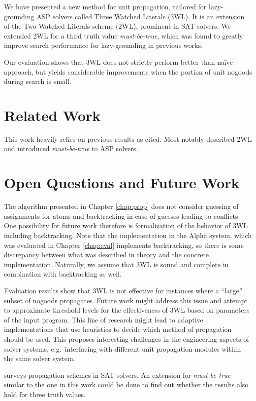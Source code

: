 \documentclass{vutinfth} %
\newcommand{\mbt}{must-be-true\xspace}
\begin{document}
We have presented a new method for unit propagation, tailored for lazy-grounding ASP solvers called Three Watched Literals (3WL). It is an extension of the Two Watched Literals scheme (2WL), prominent in SAT solvers. We extended 2WL for a third truth value \emph{\mbt}, which was found to greatly improve search performance for lazy-grounding in previous works.

Our evaluation shows that 3WL does not strictly perform better than na\"{i}ve approach, but yields considerable improvements when the portion of unit nogoods during search is small.

\section{Related Work}

This work heavily relies on previous results as cited. Most notably \citet{effsat,questsat} described 2WL and \citet{dlv-mbt} introduced \emph{\mbt} to ASP solvers.

\section{Open Questions and Future Work}

The algorithm presented in Chapter \ref{chap:prop} does not consider guessing of assignments for atoms and backtracking in case of guesses leading to conflicts. One possibility for future work therefore is formalization of the behavior of 3WL including backtracking. Note that the implementation in the Alpha system, which was evaluated in Chapter \ref{chap:eval} implements backtracking, so there is some discrepancy between what was described in theory and the concrete implementation. Naturally, we assume that 3WL is sound and complete in combination with backtracking as well.

Evaluation results show that 3WL is not effective for instances where a \enquote{large} subset of nogoods propagates. Future work might address this issue and attempt to approximate threshold levels for the effectiveness of 3WL based on parameters of the input program. This line of research might lead to adaptive implementations that use heuristics to decide which method of propagation should be used. This proposes interesting challenges in the engineering aspects of solver systems, e.g.~interfacing with different unit propagation modules within the same solver system.

\cite{effstructs} surveys propagation schemes in SAT solvers. An extension for \emph{\mbt} similar to the one in this work could be done to find out whether the results also hold for three truth values.
\end{document}
